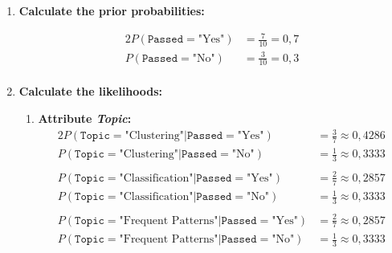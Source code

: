 \documentclass[
english,
smallborders
]{i6prcsht}
\newcommand{\PriorProbability}[2]{P(\texttt{#1}=\text{"#2"})}
\newcommand{\Likelihood}[4]{P(\texttt{#1}=\text{"#2"} | \texttt{#3}=\text{"#4"})}
\begin{document}
\begin{solution}
	\begin{enumerate}
		\item \textbf{Calculate the prior probabilities:}
		      
		      \begin{alignat*}{2}
			      \PriorProbability{Passed}{Yes} & = \frac{7}{10} = 0,7 \\
			      \PriorProbability{Passed}{No}  & = \frac{3}{10} = 0,3 \\
		      \end{alignat*}
		      
		\item \textbf{Calculate the likelihoods:}
		      
		      \begin{enumerate}
			      \item \textbf{Attribute \textit{Topic}:}
			            \begin{alignat*}{2}
				            \Likelihood{Topic}{Clustering}{Passed}{Yes}        & = \frac{3}{7} \approx 0,4286 \\
				            \Likelihood{Topic}{Clustering}{Passed}{No}         & = \frac{1}{3} \approx 0,3333 \\
				                                                               &                              \\
				            \Likelihood{Topic}{Classification}{Passed}{Yes}    & = \frac{2}{7} \approx 0,2857 \\
				            \Likelihood{Topic}{Classification}{Passed}{No}     & = \frac{1}{3} \approx 0,3333 \\
				                                                               &                              \\
				            \Likelihood{Topic}{Frequent Patterns}{Passed}{Yes} & = \frac{2}{7} \approx 0,2857 \\
				            \Likelihood{Topic}{Frequent Patterns}{Passed}{No}  & = \frac{1}{3} \approx 0,3333 \\
			            \end{alignat*}
			            

\end{enumerate}
\end{enumerate}
\end{solution}
\end{document}
